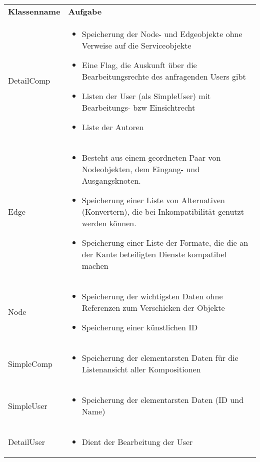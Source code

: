 \begin{table}
	\begin{tabularx}{\textwidth}{p{} | X}
		\rowcolor[HTML]{C0C0C0}
		\textbf{Klassenname} & \textbf{Aufgabe} \\
		DetailComp & \begin{itemize}
			\item Speicherung der Node- und Edgeobjekte ohne Verweise auf die Serviceobjekte
			\item Eine Flag, die Auskunft über die Bearbeitungsrechte des anfragenden Users gibt
			\item Listen der User (als SimpleUser) mit Bearbeitungs- bzw Einsichtrecht
			\item Liste der Autoren
		\end{itemize}\\
		\rowcolor[HTML]{E7E7E7}
		Edge & \begin{itemize}
		  \item Besteht aus einem geordneten Paar von Nodeobjekten, dem Eingang- und Ausgangsknoten.
			\item Speicherung einer Liste von Alternativen (Konvertern), die bei Inkompatibilität genutzt werden können.
			\item Speicherung einer Liste der Formate, die die an der Kante beteiligten Dienste kompatibel machen
		\end{itemize}\\
		Node & \begin{itemize}
			\item Speicherung der wichtigsten Daten ohne Referenzen zum Verschicken der Objekte
			\item Speicherung einer künstlichen ID
		\end{itemize}\\
		\rowcolor[HTML]{E7E7E7}
		SimpleComp & \begin{itemize}
			\item Speicherung der elementarsten Daten für die Listenansicht aller Kompositionen
		\end{itemize}\\
		SimpleUser  & \begin{itemize}
			\item Speicherung der elementarsten Daten (ID und Name)
		\end{itemize}\\
		\rowcolor[HTML]{E7E7E7}
		DetailUser & \begin{itemize}
			\item Dient der Bearbeitung der User

\end{itemize}
\end{tabularx}
\end{table}

